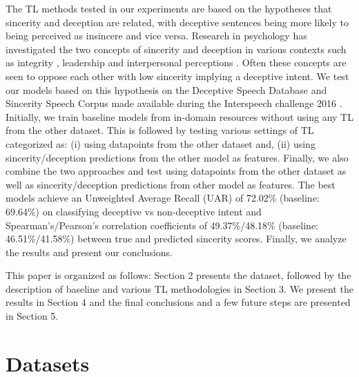 \documentclass{article}
\begin{document}
The TL methods tested in our experiments are based on the hypotheses that sincerity and deception are related, with deceptive sentences being more likely to being perceived as insincere and vice versa. 
Research in psychology has investigated the two concepts of sincerity and deception in various contexts such as integrity \cite{mcfall1987integrity}, leadership \cite{stinchfield1936sincerity} and interpersonal perceptions \cite{toris1984effects}. 
Often these concepts are seen to oppose each other with low sincerity implying a deceptive intent. 
We test our models based on this hypothesis on the Deceptive Speech Database and Sincerity Speech Corpus made available during the Interspeech challenge 2016 \cite{schuller2016interspeech}.
Initially, we train baseline models from in-domain resources without using any TL from the other dataset. 
This is followed by testing various settings of TL categorized as: (i) using datapoints from the other dataset and, (ii) using sincerity/deception predictions from the other model as features.
Finally, we also combine the two approaches and test using datapoints from the other dataset as well as sincerity/deception predictions from other model as features.
The best models achieve an Unweighted Average Recall (UAR) of 72.02\% (baseline: 69.64\%) on classifying deceptive vs non-deceptive intent and Spearman's/Pearson's correlation coefficients of 49.37\%/48.18\% (baseline: 46.51\%/41.58\%) between true and predicted sincerity scores.
Finally, we analyze the results and present our conclusions. 

This paper is organized as follows: Section 2 presents the dataset, followed by the description of baseline and various TL methodologies in Section 3.
We present the results in Section 4 and the final conclusions and a few future steps are presented in Section 5.

\section{Datasets}
\end{document}
